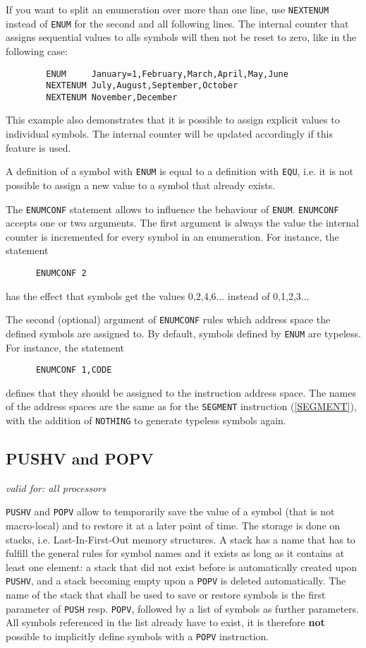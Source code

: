 \documentclass[12pt,twoside]{report}
\makeatletter
\newcommand{\bb}[1]{{\bf #1}}
\newcommand{\tty}[1]{{\tt #1}}
\newcommand{\ttindex}[1]{\index{#1@{\tt #1}}}
\makeatother
\begin{document}
If you want to split an enumeration over more than one line, use
\tty{NEXTENUM} instead of \tty{ENUM} for the second and all
following lines.  The internal counter that assigns sequential
values to alls symbols will then not be reset to zero, like in the
following case:
\begin{verbatim}
        ENUM     January=1,February,March,April,May,June
        NEXTENUM July,August,September,October
        NEXTENUM November,December
\end{verbatim}
This example also demonstrates that it is possible to assign
explicit values to individual symbols.  The internal counter will
be updated accordingly if this feature is used.

A definition of a symbol with \tty{ENUM} is equal to a definition with
\tty{EQU}, i.e. it is not possible to assign a new value to a symbol that
already exists.

The \tty{ENUMCONF} statement allows to influence the behaviour of
\tty{ENUM}.  \tty{ENUMCONF} accepts one or two arguments.  The
first argument is always the value the internal counter is
incremented for every symbol in an enumeration.  For instance,
the statement
\begin{verbatim}
      ENUMCONF 2
\end{verbatim}
has the effect that symbols get the values 0,2,4,6... instead of
0,1,2,3...

The second (optional) argument of \tty{ENUMCONF} rules which
address space the defined symbols are assigned to.  By default,
symbols defined by \tty{ENUM} are typeless.  For instance, the
statement
\begin{verbatim}
      ENUMCONF 1,CODE
\end{verbatim}
defines that they should be assigned to the instruction address
space.  The names of the address spaces are the same as for the
\tty{SEGMENT} instruction (\ref{SEGMENT}), with the addition of
\tty{NOTHING} to generate typeless symbols again.


\subsection{PUSHV and POPV}
\ttindex{PUSHV}\ttindex{POPV}

{\em valid for: all processors}

\tty{PUSHV} and \tty{POPV} allow to temporarily save the value of a symbol
(that is not macro-local) and to restore it at a later point of time.  The
storage is done on stacks, i.e. Last-In-First-Out memory structures.  A
stack has a name that has to fulfill the general rules for symbol names
and it exists as long as it contains at least one element: a stack that
did not exist before is automatically created upon \tty{PUSHV}, and a
stack becoming empty upon a \tty{POPV} is deleted automatically.  The name
of the stack that shall be used to save or restore symbols is the first
parameter of \tty{PUSH} resp. \tty{POPV}, followed by a list of symbols as
further parameters.  All symbols referenced in the list already have to
exist, it is therefore \bb{not} possible to implicitly define symbols with
a \tty{POPV} instruction.
\end{document}
